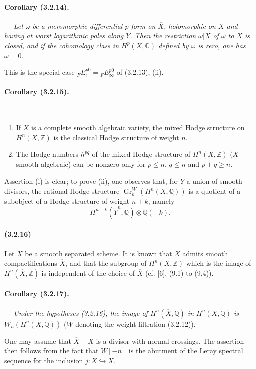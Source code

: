 \documentclass[10pt]{article}
\newcommand{\C}{\mathbb C}
\newcommand{\Q}{\mathbb Q}
\newcommand{\Z}{\mathbb Z}
\newcommand{\Gr}{\operatorname{Gr}}
\begin{document}
\paragraph{Corollary (3.2.14).} --- {\itshape Let $\omega$ be a meromorphic differential $p$-form on $\overline X$, holomorphic on $X$ and having at worst logarithmic poles along $Y$. Then the restriction $\omega|X$ of $\omega$ to $X$ is closed, and if the cohomology class in $H^p(X,\C)$ defined by $\omega$ is zero, one has $\omega=0$.}

This is the special case ${}_FE_1^{p0}={}_FE_\infty^{p0}$ of (3.2.13), (ii).

\paragraph{Corollary (3.2.15).} --- {\itshape
\begin{enumerate}[label=(\roman*),font=\itshape]
\item If $X$ is a complete smooth algebraic variety, the mixed Hodge structure on $H^n(X,\Z)$ is the classical Hodge structure of weight $n$.
\item The Hodge numbers $h^{pq}$ of the mixed Hodge structure of $H^n(X,\Z)$ ($X$ smooth algebraic) can be nonzero only for $p\le n$, $q\le n$ and $p+q\ge n$.
\end{enumerate}}
Assertion (i) is clear; to prove (ii), one observes that, for $Y$ a union of smooth divisors, the rational Hodge structure $\Gr_k^W(H^n(X,\Q))$ is a quotient of a subobject of a Hodge structure of weight $n+k$, namely
\[
H^{n-k}(\widetilde Y^n,\Q)\otimes\Q(-k).
\]

\paragraph{(3.2.16)} Let $X$ be a smooth separated scheme. It is known that $X$ admits smooth compactifications $\overline X$, and that the subgroup of $H^n(X,\Z)$ which is the image of $H^n(\overline X,\Z)$ is independent of the choice of $\overline X$ (cf. [6], (9.1) to (9.4)).

\paragraph{Corollary (3.2.17).} --- {\itshape Under the hypotheses (3.2.16), the image of $H^n(\overline X,\Q)$ in $H^n(X,\Q)$ is} $W_n(H^n(X,\Q))$ ($W$ denoting the weight filtration (3.2.12)).

One may assume that $\overline X-X$ is a divisor with normal crossings. The assertion then follows from the fact that $W[-n]$ is the abutment of the Leray spectral sequence for the inclusion $j:X\hookrightarrow\overline X$.
\end{document}
